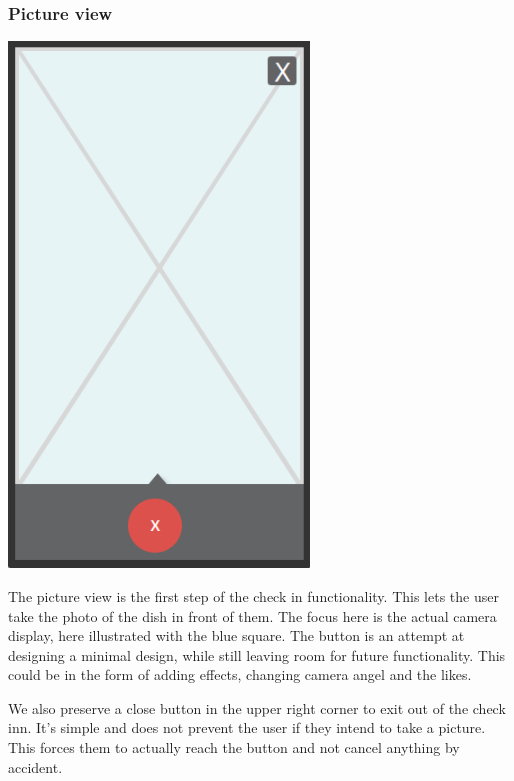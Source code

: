 \documentclass[12pt]{article}
\begin{document}
\subsubsection{Picture view}
\includegraphics[width=8cm]{pictures/prototype/picture}
\bigbreak

The picture view is the first step of the check in functionality. This lets the
user take the photo of the dish in front of them. The focus here is the actual
camera display, here illustrated with the blue square. The button is an attempt
at designing a minimal design, while still leaving room for future functionality.
This could be in the form of adding effects, changing camera angel and the
likes.

We also preserve a close button in the upper right corner to exit out of the
check inn. It's simple and does not prevent the user if they intend to take a
picture. This forces them to actually reach the button and not cancel anything
by accident.
\end{document}
